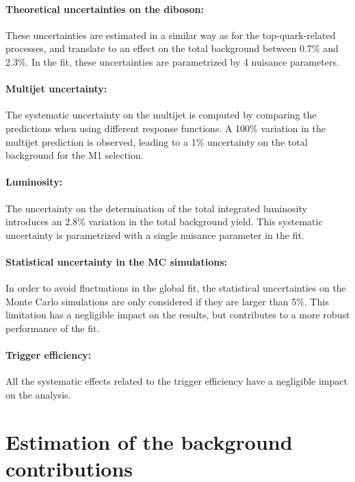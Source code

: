 \paragraph{Theoretical uncertainties on the diboson:} These uncertainties are estimated in a similar way as for the top-quark-related processes, and translate to an effect on the total background between 0.7\% and 2.3\%.
In the fit, these uncertainties are parametrized by 4 nuisance parameters.

\paragraph{Multijet uncertainty:} The systematic uncertainty on the multijet is computed by comparing the predictions when using different response functions.
A 100\% variation in the multijet prediction is observed, leading to a 1\% uncertainty on the total background for the M1 selection.

\paragraph{Luminosity:} The uncertainty on the determination of the total integrated luminosity introduces an 2.8\% variation in the total background yield.
This systematic uncertainty is parametrized with a single nuisance parameter in the fit.

\paragraph{Statistical uncertainty in the MC simulations:} 
In order to avoid fluctuations in the global fit, the statistical uncertainties on the Monte Carlo simulations are only considered if they are larger than 5\%.
This limitation has a negligible impact on the results, but contributes to a more robust performance of the fit.

\paragraph{Trigger efficiency:} All the systematic effects related to the trigger efficiency have a negligible impact on the analysis.

\paragraph{}


\section{Estimation of the background contributions}
    \label{sec:ControlRegions}

